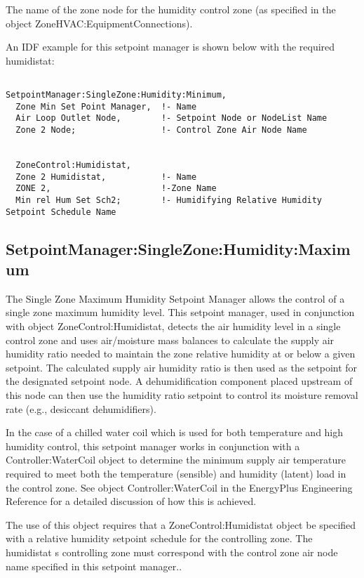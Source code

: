 The name of the zone node for the humidity control zone (as specified in the object ZoneHVAC:EquipmentConnections).

An IDF example for this setpoint manager is shown below with the required humidistat:

\begin{lstlisting}

SetpointManager:SingleZone:Humidity:Minimum,
  Zone Min Set Point Manager,  !- Name
  Air Loop Outlet Node,        !- Setpoint Node or NodeList Name
  Zone 2 Node;                 !- Control Zone Air Node Name


  ZoneControl:Humidistat,
  Zone 2 Humidistat,           !- Name
  ZONE 2,                      !-Zone Name
  Min rel Hum Set Sch2;        !- Humidifying Relative Humidity Setpoint Schedule Name
\end{lstlisting}

\subsection{SetpointManager:SingleZone:Humidity:Maximum}\label{setpointmanagersinglezonehumiditymaximum}

The Single Zone Maximum Humidity Setpoint Manager allows the control of a single zone maximum humidity level. This setpoint manager, used in conjunction with object ZoneControl:Humidistat, detects the air humidity level in a single control zone and uses air/moisture mass balances to calculate the supply air humidity ratio needed to maintain the zone relative humidity at or below a given setpoint. The calculated supply air humidity ratio is then used as the setpoint for the designated setpoint node. A dehumidification component placed upstream of this node can then use the humidity ratio setpoint to control its moisture removal rate (e.g., desiccant dehumidifiers).

In the case of a chilled water coil which is used for both temperature and high humidity control, this setpoint manager works in conjunction with a Controller:WaterCoil object to determine the minimum supply air temperature required to meet both the temperature (sensible) and humidity (latent) load in the control zone. See object Controller:WaterCoil in the EnergyPlus Engineering Reference for a detailed discussion of how this is achieved.

The use of this object requires that a ZoneControl:Humidistat object be specified with a relative humidity setpoint schedule for the controlling zone. The humidistat s controlling zone must correspond with the control zone air node name specified in this setpoint manager..

